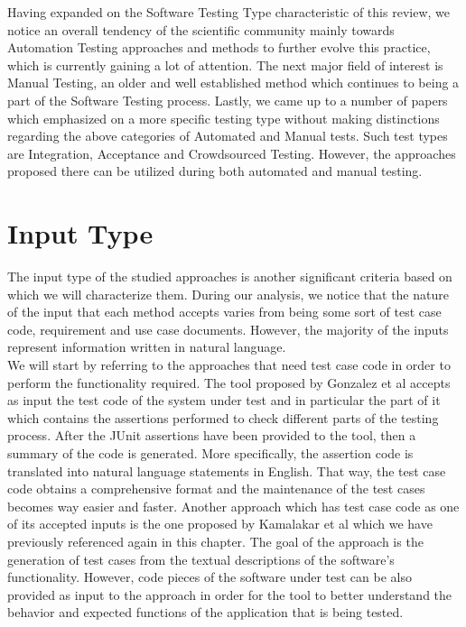 Having expanded on the Software Testing Type characteristic of this review, we notice an overall tendency of the scientific community mainly towards Automation Testing approaches and methods to further 
evolve this practice, which is currently gaining a lot of attention. The next major field of interest is Manual Testing, an older and well established method which continues to being a part of the Software 
Testing process. Lastly, we came up to a number of papers which emphasized on a more specific testing type without making distinctions regarding the above categories of Automated and Manual tests. Such test 
types are Integration, Acceptance and Crowdsourced Testing. However, the approaches proposed there can be utilized during both automated and manual testing.

\section{Input Type}
The input type of the studied approaches is another significant criteria based on which we will characterize them. During our analysis, we notice 
that the nature of the input that each method accepts varies from being some sort of test case code, requirement and use case documents. However, the 
majority of the inputs represent information written in natural language.\\

We will start by referring to the approaches that need test case code in order to perform the functionality required. The tool proposed by Gonzalez et al \cite{10.1145/3283812.3283819} accepts 
as input the test code of the system under test and in particular the part of it which contains the assertions performed to check different parts of the testing 
process. After the JUnit assertions have been provided to the tool, then a summary of the code is generated. More specifically, the assertion code 
is translated into natural language statements in English. That way, the test case code obtains a comprehensive format and the maintenance 
of the test cases becomes way easier and faster. Another approach which has test case code as one of its accepted inputs is the one proposed by 
Kamalakar et al \cite{kamalakar2013automatically} which we have previously referenced again in this chapter. The goal of the approach is the generation 
of test cases from the textual descriptions of the software's functionality. However, code pieces of the software under test can be also provided as input 
to the approach in order for the tool to better understand the behavior and expected functions of the application that is being tested.\\

